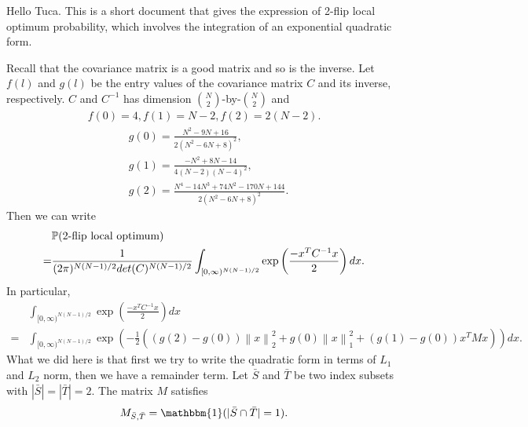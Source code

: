 \documentclass[10pt]{article}
\author{Yi Gu}
\newcommand{\p}{\mathbb{P}}
\newcommand{\norm}[1]{\left\lVert#1\right\rVert}
\newenvironment{Proof of lemma}{\noindent{\bf Proof of Lemma}}{\hfill$\Box$\newline}
\newenvironment{Proof of claim}{\noindent{\bf Proof of claim}}{\hfill$\Box$\newline}
\newenvironment{Proof of theorem}{\noindent{\bf Proof of Theorem}}{\hfill\scriptsize{$\Box$}\newline}
\newenvironment{Proof of theorems}{\noindent{\bf Proof of Theorems}}{\hfill$\Box$\newline}
\newenvironment{Proof of proposition}{\noindent{\bf Proof of Proposition}}{\hfill$\Box$\newline}
\newenvironment{Proof of propositions}{\noindent{\bf Proof of Propositions}}{\hfill$\Box$\newline}
\newenvironment{Proof of exercise}{\noindent{\it Proof of Exercise:}}{\hfill$\Box$}
\begin{document}
Hello Tuca. This is a short document that gives the expression of 2-flip local optimum probability, which involves the integration of an exponential quadratic form. 

Recall that the covariance matrix is a good matrix and so is the inverse. Let $f(l)$ and $g(l)$ be the entry values of the covariance matrix $C$ and its inverse, respectively. $C$ and $C^{-1}$ has dimension $\binom{N}{2}$-by-$\binom{N}{2}$ and
\begin{align}
    f(0) = 4, f(1)= N-2, f(2) = 2(N-2).
\end{align}
\begin{align}
    &g(0)=\frac{N^2-9N+16}{2(N^2-6N+8)^2}, \nonumber \\
    &g(1)=\frac{-N^2+8N-14}{4(N-2)(N-4)^2}, \nonumber \\
    &g(2)=\frac{N^4-14N^3+74N^2-170N+144}{2(N^2-6N+8)^2}.
\end{align}
Then we can write
\begin{align}
    &\p(\text{\normalfont 2-flip local optimum}) \nonumber \\
    =&\frac{1}{(2\pi)^{N(N-1)/2}det(C)^{N(N-1)/2}} \int_{[0,\infty)^{N(N-1)/2}}\exp \left(\frac{-x^T C^{-1} x}{2}\right)dx.
\end{align}
In particular,
\begin{align}
    &\int_{[0,\infty)^{N(N-1)/2}}\exp \left(\frac{-x^T C^{-1} x}{2}\right)dx \nonumber \\
    =&\int_{[0,\infty)^{N(N-1)/2}} \exp \left(-\frac{1}{2}\left((g(2)-g(0))\norm{x}_2^2 + g(0)\norm{x}_1^2 + (g(1)-g(0))x^T M x\right)\right)dx.
\end{align}
What we did here is that first we try to write the quadratic form in terms of $L_1$ and $L_2$ norm, then we have a remainder term. Let $\bar{S}$ and $\bar{T}$ be two index subsets with $|\bar{S}|=|\bar{T}|=2$. The matrix $M$ satisfies
\begin{align}
    M_{\bar{S},\bar{T}} = \mathbbm{1}(|\bar{S} \cap \bar{T}|=1).
\end{align}
\end{document}
